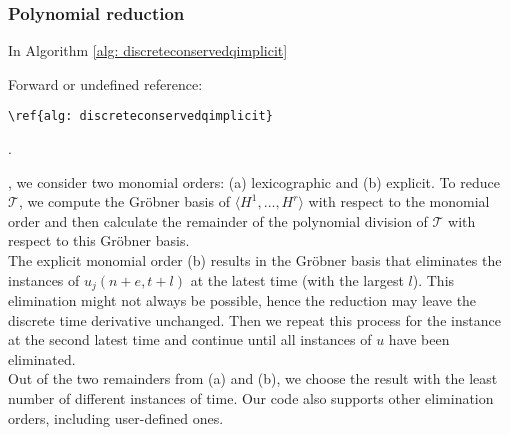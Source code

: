 \documentclass[sigconf,twocolumn]{acmart}
\newcommand{\1}{{\chi}}
\numberwithin{equation}{section}
\theoremstyle{thmlemcorr}
\numberwithin{theorem}{section}
\theoremstyle{thmlemcorr*}
\theoremstyle{defi}
\theoremstyle{remexample}
\theoremstyle{ass}
\begin{document}
	\subsubsection*{Polynomial reduction}
	In Algorithm \ref{alg: discreteconservedqimplicit}
 {\color{red} Forward or undefined reference: \begin{verbatim}\ref{alg: discreteconservedqimplicit}\end{verbatim}.}
, we consider two monomial orders: (a) lexicographic and (b) explicit.
	To reduce \(\mathcal{T}\), we compute the Gr{\"o}bner basis of \(\langle H^1,\ldots,H^r\rangle\) with respect to the monomial order and then calculate the remainder of the polynomial division of \(\mathcal{T}\) with respect to this Gr{\"o}bner basis.\\
	The explicit monomial order (b) results in the Gr{\"o}bner basis that eliminates the instances of \(u_j(n+e,t+l)\) at the latest time (with the largest \(l\)). This elimination might not always be possible, hence the reduction may leave the discrete time derivative unchanged. Then we repeat this process for the instance at the second latest time and continue until all instances of \(u\) have been eliminated.\\
	Out of the two remainders from (a) and (b), we choose the result with the least number of different instances of time. Our code also supports other elimination orders, including user-defined ones.
\end{document}
